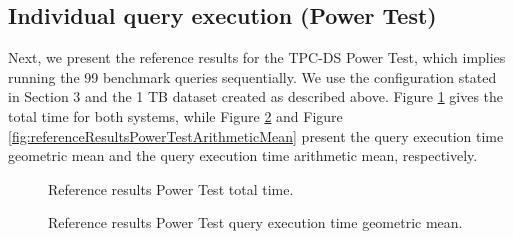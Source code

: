 \subsection{Individual query execution (Power Test)}

Next, we present the reference results for the TPC-DS Power Test, which implies running the 99 benchmark queries sequentially. We use the configuration stated in Section 3 and the 1 TB dataset created as described above. Figure \ref{fig:referenceResultsPowerTestTotalTime} gives the total time for both systems, while Figure \ref{fig:referenceResultsPowerTestGeomean} and Figure \ref{fig:referenceResultsPowerTestArithmeticMean} present the query execution time geometric mean and the query execution time arithmetic mean, respectively.

\begin{figure}
   \begin{center}
   \end{center}
   \caption{Reference results Power Test total time.}
   \label{fig:referenceResultsPowerTestTotalTime}
\end{figure}

\begin{figure}
   \begin{center}
   \end{center}
   \caption{Reference results Power Test query execution time geometric mean.}
   \label{fig:referenceResultsPowerTestGeomean}
\end{figure}

